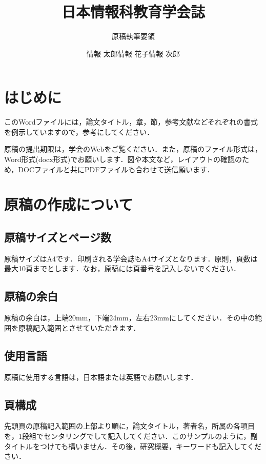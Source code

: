 \documentclass[dvipdfmx]{jaeis-journal}
\title{日本情報科教育学会誌}
\subtitle{原稿執筆要領}
\author{情報 太郎\hspace{3cm}情報 花子\hspace{3cm}情報 次郎}
\affiliation{情報大学教育学部\hspace{2cm}情報大学工学部\hspace{2cm}情報大学大学院大学}
\begin{document}

\maketitle

\section{はじめに}


このWordファイルには，論文タイトル，章，節，参考文献などそれぞれの書式を例示していますので，参考にしてください．

原稿の提出期限は，学会のWebをご覧ください．また，原稿のファイル形式は，Word形式(docx形式)でお願いします．図や本文など，レイアウトの確認のため，DOCファイルと共にPDFファイルも合わせて送信願います．

\section{原稿の作成について}
\subsection{原稿サイズとページ数}

原稿サイズはA4です．印刷される学会誌もA4サイズとなります．原則，頁数は最大10頁までとします．なお，原稿には頁番号を記入しないでください．

\subsection{原稿の余白}

原稿の余白は，上端20mm，下端24mm，左右23mmにしてください．その中の範囲を原稿記入範囲とさせていただきます．

\subsection{使用言語}

原稿に使用する言語は，日本語または英語でお願いします．

\subsection{頁構成}

先頭頁の原稿記入範囲の上部より順に，論文タイトル，著者名，所属の各項目を，1段組でセンタリングでして記入してください．このサンプルのように，副タイトルをつけても構いません．その後，研究概要，キーワードも記入してください．
\end{document}
